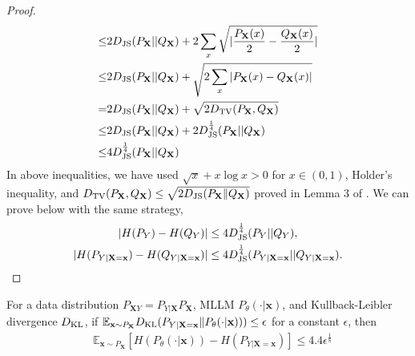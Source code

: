 \begin{proof}
\begin{align*}
\leq & 2 D_{\rm JS}(P_{\mathbf{X}}||Q_{\mathbf{X}}) + 2 \sum_{x} \sqrt{ |\frac{P_{\mathbf{X}}(x)}{2} - \frac{Q_{\mathbf{X}}(x)}{2}| } \\
\leq & 2 D_{\rm JS}(P_{\mathbf{X}}||Q_{\mathbf{X}}) + \sqrt{2\sum_{x} |P_{\mathbf{X}}(x) - Q_{\mathbf{X}}(x)| } \\
=& 2 D_{\rm JS}(P_{\mathbf{X}}||Q_{\mathbf{X}}) + \sqrt{2 D_{\rm TV}(P_{\mathbf{X}},Q_{\mathbf{X}}) } \\
\leq & 2 D_{\rm JS}(P_{\mathbf{X}}||Q_{\mathbf{X}}) + 2 D^{\frac{1}{4}}_{\rm JS}(P_{\mathbf{X}}||Q_{\mathbf{X}}) \\
\leq & 4 D^{\frac{1}{4}}_{\rm JS}(P_{\mathbf{X}}||Q_{\mathbf{X}})
\end{align*}
In above inequalities, we have used $\sqrt{x}+x\log x>0$ for $x\in (0,1)$, Holder's inequality, and $D_{\rm TV}(P_{\mathbf{X}},Q_{\mathbf{X}}) \leq \sqrt{2 D_{\rm JS}(P_{\mathbf{X}}\| Q_{\mathbf{X}})}$ proved in Lemma 3 of \citet{NEURIPS2018_565e8a41}.
We can prove below with the same strategy,
\begin{align*}
|H(P_{Y}) - H(Q_{Y})| &\leq 4 D^{\frac{1}{4}}_{\rm JS}(P_{Y}|| Q_{Y}), \\  
   | H(P_{Y|\mathbf{X}=\mathbf{x}}) - H(Q_{Y|\mathbf{X}=\mathbf{x}}) | & \leq 4 D^{\frac{1}{4}}_{\rm JS}(P_{Y|\mathbf{X}=\mathbf{x}}|| Q_{Y|\mathbf{X}=\mathbf{x}}).
\end{align*}
\end{proof}


\begin{corollary}\label{thm:cond_entropy_diff_bound-2.0} For a data distribution $P_{\mathbf{X}Y}=P_{Y|\mathbf{X}}P_{\mathbf{X}}$, MLLM $P_{\theta}(\cdot|\mathbf{x})$, and Kullback-Leibler divergence $D_{\rm KL}$, if ${\mathbb{E}_{\mathbf{x}\sim P_{\mathbf{X}}} D_{\rm KL}(P_{Y|\mathbf{X}=\mathbf{x}}\|P_{\theta}(\cdot|\mathbf{x}))})\leq \epsilon$ for a constant $\epsilon$, then
\begin{equation*}
\begin{split}
    & \mathbb{E}_{\mathbf{x}\sim P_{\mathbf{X}}} [ H( P_{\theta}(\cdot|\mathbf{x})) - H(P_{Y|\mathbf{X}=\mathbf{x}})]
     \leq  4.4 \epsilon^{\frac{1}{8}}
\end{split}
\end{equation*}
\end{corollary}

